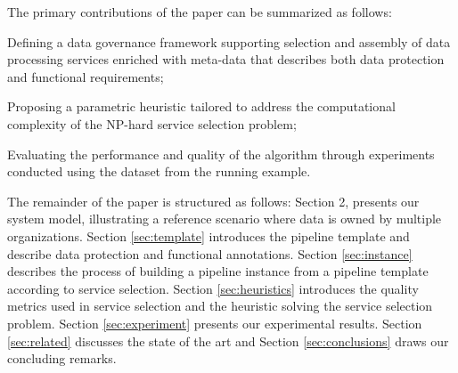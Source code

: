 The primary contributions of the paper can be summarized as follows:
\begin{enumerate*}
  \item Defining a data governance framework supporting selection and assembly of data processing services enriched with meta-data that describes both data protection and functional requirements;
  \item Proposing a parametric heuristic tailored to address the computational complexity of the NP-hard service selection problem;
  \item Evaluating the performance and quality of the algorithm through experiments conducted using the dataset from the running example.
\end{enumerate*}


The remainder of the paper is structured as follows: Section 2, presents our system model, illustrating a reference scenario where data is owned by multiple organizations. Section \ref{sec:template} introduces the pipeline template and describe data protection and functional annotations. Section \ref{sec:instance} describes the process of building a pipeline instance from a pipeline template according to service selection. Section \ref{sec:heuristics} introduces the quality metrics used in service selection and the heuristic solving the service selection problem. Section \ref{sec:experiment} presents our experimental results. Section \ref{sec:related} discusses the state of the art and Section \ref{sec:conclusions} draws our concluding remarks.